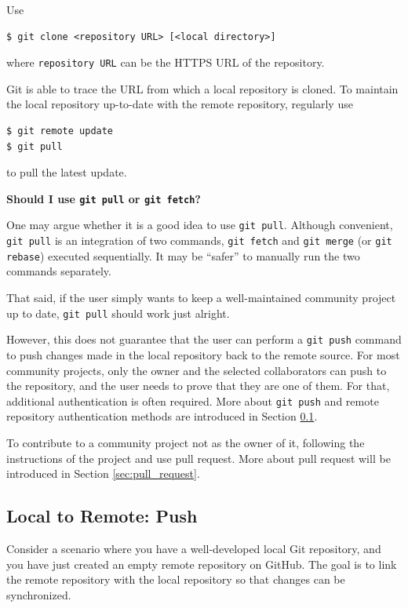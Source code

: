 Use
\begin{lstlisting}
$ git clone <repository URL> [<local directory>]
\end{lstlisting}
where \verb|repository URL| can be the HTTPS URL of the repository. 

Git is able to trace the URL from which a local repository is cloned. To maintain the local repository up-to-date with the remote repository, regularly use
\begin{lstlisting}
$ git remote update
$ git pull
\end{lstlisting}
to pull the latest update.

\begin{mdframed}
\noindent \textbf{Should I use \texttt{git pull} or \texttt{git fetch}?}

One may argue whether it is a good idea to use \verb|git pull|. Although convenient, \verb|git pull| is an integration of two commands, \verb|git fetch| and \verb|git merge| (or \verb|git rebase|) executed sequentially. It may be ``safer'' to manually run the two commands separately.

That said, if the user simply wants to keep a well-maintained community project up to date, \verb|git pull| should work just alright.
\end{mdframed}

However, this does not guarantee that the user can perform a \verb|git push| command to push changes made in the local repository back to the remote source. For most community projects, only the owner and the selected collaborators can push to the repository, and the user needs to prove that they are one of them. For that, additional authentication is often required. More about \verb|git push| and remote repository authentication methods are introduced in Section \ref{sec:gitpush}.

To contribute to a community project not as the owner of it, following the instructions of the project and use pull request. More about pull request will be introduced in Section \ref{sec:pull_request}.

\subsection{Local to Remote: Push} \label{sec:gitpush}

Consider a scenario where you have a well-developed local Git repository, and you have just created an empty remote repository on GitHub. The goal is to link the remote repository with the local repository so that changes can be synchronized.

